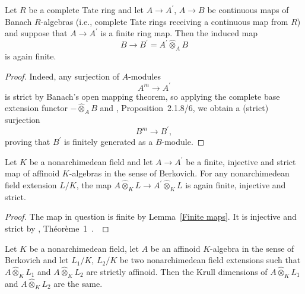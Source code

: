 \begin{lemma}\label{Finite maps}Let $R$ be a complete Tate ring and let $A\to A^{\prime}$, $A\to B$ be continuous maps of Banach $R$-algebras (i.e., complete Tate rings receiving a continuous map from $R$) and suppose that $A\to A^{\prime}$ is a finite ring map. Then the induced map \begin{equation*}B\to B^{\prime}=A^{\prime}\widehat{\otimes}_{A}B\end{equation*}is again finite. \end{lemma}
\begin{proof}Indeed, any surjection of $A$-modules \begin{equation*}A^{m}\to A^{\prime}\end{equation*}is strict by Banach's open mapping theorem, so applying the complete base extension functor $-\widehat{\otimes}_{A}B$ and \cite{BGR}, Proposition~2.1.8/6, we obtain a (strict) surjection \begin{equation*}B^{m}\to B^{\prime},\end{equation*}proving that $B^{\prime}$ is finitely generated as a $B$-module. \end{proof}
\begin{lemma}\label{Finite maps 2}Let $K$ be a nonarchimedean field and let $A\to A^{\prime}$ be a finite, injective and strict map of affinoid $K$-algebras in the sense of Berkovich. For any nonarchimedean field extension $L/K$, the map $A\widehat{\otimes}_{K}L\to A^{\prime}\widehat{\otimes}_{K}L$ is again finite, injective and strict.\end{lemma}
\begin{proof}The map in question is finite by Lemma~\ref{Finite maps}. It is injective and strict by \cite{Gruson}, Théorème~1~. \end{proof} 
\begin{lemma}\label{Noether normalization}Let $K$ be a nonarchimedean field, let $A$ be an affinoid $K$-algebra in the sense of Berkovich and let $L_{1}/K$, $L_{2}/K$ be two nonarchimedean field extensions such that $A\widehat{\otimes}_{K}L_{1}$ and $A\widehat{\otimes}_{K}L_{2}$ are strictly affinoid. Then the Krull dimensions of $A\widehat{\otimes}_{K}L_{1}$ and $A\widehat{\otimes}_{K}L_{2}$ are the same. \end{lemma}
